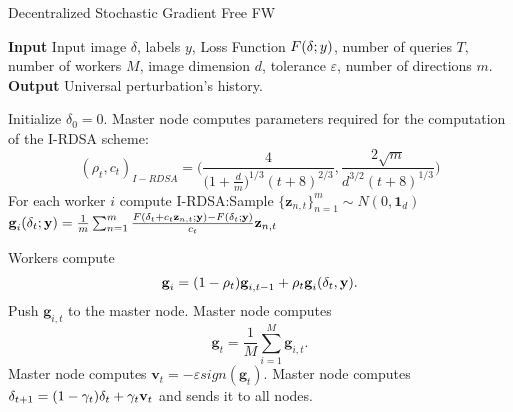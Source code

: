 \begin{algorithm}
	\caption{Decentralized Stochastic Gradient Free FW}\label{decentralized} 
	 \textbf{Input} Input image \boldmath$\delta$, labels $y$, Loss Function $F(\text{\boldmath}\delta;y)$, number of queries $T$, number of workers $M$, image dimension $d$, tolerance $\varepsilon$, number of directions $m$.\\
	 \textbf{Output} Universal perturbation's history.
	\begin{algorithmic}[1]		
		\State Initialize \boldmath$\delta_0 = \text{0}$.
		\State Master node computes parameters required for the computation of the I-RDSA scheme: 
		{\scriptsize\[(\rho_t,c_t)_{I-RDSA} =\bigg(\frac{4}{\big(1+\frac{d}{m}\big)^{1/3}(t+8)^{2/3}}, \frac{2\sqrt{m}}{d^{3/2}(t+8)^{1/3}}\bigg)\]}
		\State For each worker $i$ compute I-RDSA:\newline Sample $\{\textbf{z}_{n,t}\}_{n=1}^m \sim N(0, \textbf{1}_d)$ \newline
		 $\textbf{g}_i(\text{\boldmath}\delta_t;\textbf{y}) = \frac{1}{m} \sum_{n=1}^{m} \frac{F(\text{\boldmath}\delta_t + c_t\textbf{z}_{n,t};\textbf{y}) - F(\text{\boldmath}\delta_t;\textbf{y})}{c_t}\textbf{z}_{n,t}$
		
		\State Workers compute \[\textbf{g}_i= (1- \rho_t)\textbf{g}_{i,t-1} + \rho_t\textbf{g}_i(\text{\boldmath}\delta_t,\textbf{y}).\]
		\State Push $\textbf{g}_{i,t}$ to the master node.
		\State Master node computes 
		\[\textbf{g}_t = \frac{1}{M} \sum_{i=1}^{M} \textbf{g}_{i,t}.\]
		\State Master node computes $\textbf{v}_t = - \varepsilon sign(\textbf{g}_t)$.
		\State Master node computes \boldmath$\delta_{t+1} = (1-\gamma_t)\text{\boldmath}\delta_t + \gamma_t\textbf{v}_t$ and sends it to all nodes.
		\EndFor

	\end{algorithmic}
\end{algorithm}
